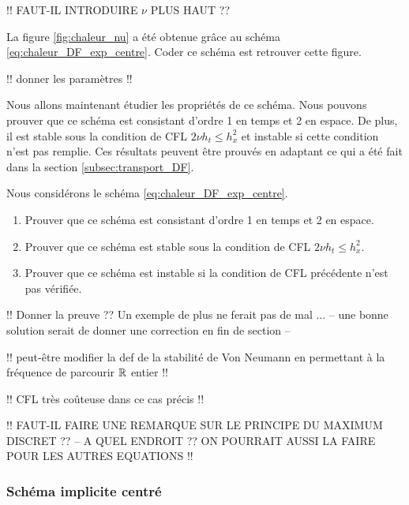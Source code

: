 \documentclass[12pt,a4paper,twoside]{article}
\begin{document}
!! FAUT-IL INTRODUIRE $\nu$ PLUS HAUT ??


\begin{exercise}
  La figure \ref{fig:chaleur_nu} 
  a \'et\'e obtenue gr\^ace au sch\'ema \eqref{eq:chaleur_DF_exp_centre}.
  Coder ce sch\'ema est retrouver cette figure.
  
  !! donner les param\`etres !!
\end{exercise}


Nous allons maintenant \'etudier les propri\'et\'es de ce sch\'ema.
Nous pouvons prouver que ce sch\'ema est consistant d'ordre 1 en temps et 2 en espace.
De plus, il est stable sous la condition de CFL $2 \nu h_t \leq h_x^2$ 
et instable si cette condition n'est
pas remplie.
Ces r\'esultats peuvent \^etre prouv\'es en adaptant ce qui a \'et\'e fait dans
la section \ref{subsec:transport_DF}.

\begin{exercise}
  Nous consid\'erons le sch\'ema \eqref{eq:chaleur_DF_exp_centre}.
  \begin{enumerate}
  \item Prouver que ce sch\'ema est consistant d'ordre 1 en temps et 2 en espace.
  \item Prouver que ce sch\'ema est stable sous la condition de CFL
    $2 \nu h_t \leq h_x^2$.
  \item Prouver que ce sch\'ema est instable si la condition de CFL
    pr\'ec\'edente n'est pas v\'erifi\'ee.
  \end{enumerate}
\end{exercise}




!! Donner la preuve ??
Un exemple de plus ne ferait pas de mal ...
-- une bonne solution serait de donner une correction en fin de section --

!! peut-\^etre modifier la def de la stabilit\'e de Von Neumann en permettant
\`a la fr\'equence de parcourir $\mathbb{R}$ entier !!

!! CFL tr\`es co\^uteuse dans ce cas pr\'ecis !!


!! FAUT-IL FAIRE UNE REMARQUE SUR LE PRINCIPE DU MAXIMUM DISCRET ??
-- A QUEL ENDROIT ?? ON POURRAIT AUSSI LA FAIRE POUR LES AUTRES EQUATIONS !!

\subsubsection{Sch\'ema implicite centr\'e}
\label{subsubsec:chaleur_DF_implicite}
\end{document}
